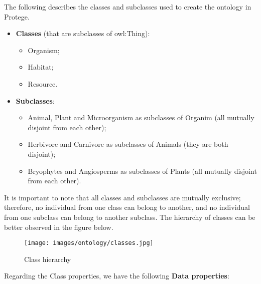 
The following describes the classes and subclasses used to create the ontology in Protege.
\\

\begin{itemize}
    \item \textbf{Classes} (that are subclasses of owl:Thing):
    \begin{itemize}
        \item Organism;

        \item Habitat;

        \item Resource.
        \\
    \end{itemize}

    \item \textbf{Subclasses}:
    \begin{itemize}
        \item Animal, Plant and Microorganism as subclasses of Organim (all mutually disjoint from each other);

        \item Herbivore and Carnivore as subclasses of Animals (they are both disjoint);

        \item Bryophytes and  Angiosperms as subclasses of Plants (all mutually disjoint from each other).
        \\
    \end{itemize} 
\end{itemize}

It is important to note that all classes and subclasses are mutually exclusive; therefore, no individual from one class can belong to another, and no individual from one subclass can belong to another subclass. The hierarchy of classes can be better observed in the figure below.

\begin{figure}[H]
    \centering
    \texttt{[image: images/ontology/classes.jpg]}
    \caption{Class hierarchy}
    \label{fig:diagram}
\end{figure}


Regarding the Class properties, we have the following \textbf{Data properties}:
\\

